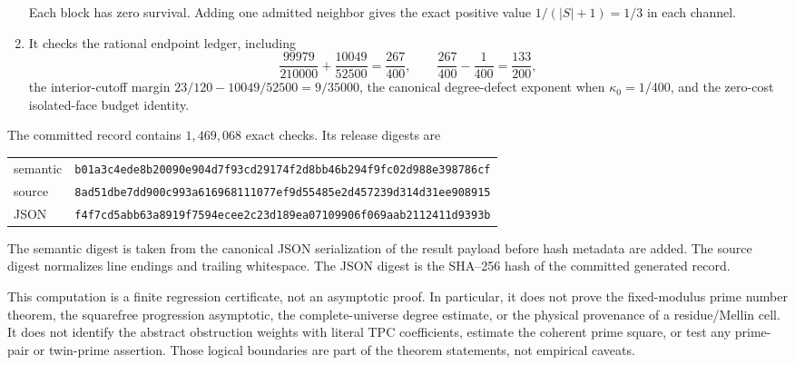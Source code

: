 \begin{enumerate}[label=\textup{(\roman*)},leftmargin=2.4em]
       Each block has zero survival.  Adding one admitted neighbor gives
       the exact positive value \(1/(|S|+1)=1/3\) in each channel.
 \item It checks the rational endpoint ledger, including
       \begin{equation}
        \frac{99979}{210000}+\frac{10049}{52500}
        =\frac{267}{400},
        \qquad
        \frac{267}{400}-\frac1{400}=\frac{133}{200},
        \label{eq:tpc50-certificate-endpoint-identities}
       \end{equation}
       the interior-cutoff margin
       \(23/120-10049/52500=9/35000\), the canonical degree-defect exponent when
       \(\kappa_0=1/400\), and the zero-cost isolated-face budget
       identity.
\end{enumerate}

The committed record contains \(1{,}469{,}068\) exact checks.  Its
release digests are
\begin{center}
\small
\begin{tabular}{@{}ll@{}}
semantic & \nolinkurl{b01a3c4ede8b20090e904d7f93cd29174f2d8bb46b294f9fc02d988e398786cf}\\
source & \nolinkurl{8ad51dbe7dd900c993a616968111077ef9d55485e2d457239d314d31ee908915}\\
JSON & \nolinkurl{f4f7cd5abb63a8919f7594ecee2c23d189ea07109906f069aab2112411d9393b}
\end{tabular}
\end{center}
The semantic digest is taken from the canonical JSON serialization of
the result payload before hash metadata are added.  The source digest
normalizes line endings and trailing whitespace.  The JSON digest is
the SHA--256 hash of the committed generated record.

This computation is a finite regression certificate, not an
asymptotic proof.  In particular, it does not prove the fixed-modulus
prime number theorem, the squarefree progression asymptotic, the
complete-universe degree estimate, or the physical provenance of a
residue/Mellin cell.  It does not identify the abstract obstruction
weights with literal TPC coefficients, estimate the coherent prime
square, or test any prime-pair or twin-prime assertion.  Those logical
boundaries are part of the theorem statements, not empirical caveats.
